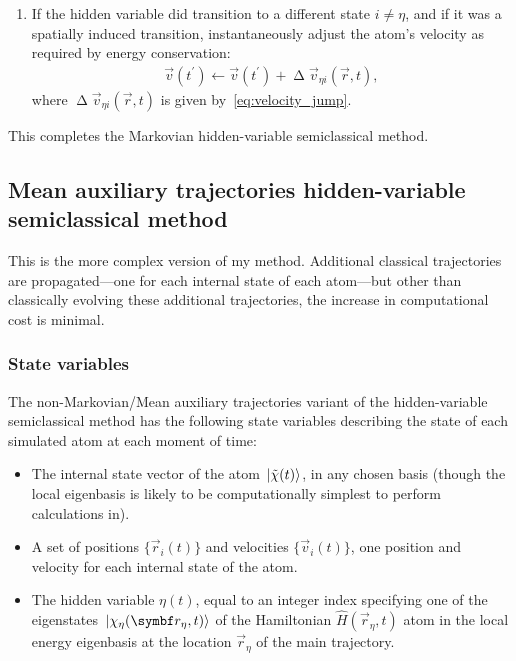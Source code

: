 \begin{enumerate}
    \item If the hidden variable did transition to a different state $i\neq\eta$, and if it was a spatially induced transition, instantaneously adjust the atom's velocity as required by energy conservation:
    \begin{align}
    \vec v(t^\prime) \leftarrow \vec v(t^\prime) + \upDelta \vec v_{\eta i}(\vec r, t),
    \end{align}
    where $\upDelta \vec v_{\eta i}(\vec r, t)$ is given by~\eqref{eq:velocity_jump}.
\end{enumerate}

This completes the Markovian hidden-variable semiclassical method.

\subsection{Mean auxiliary trajectories hidden-variable semiclassical method}\label{sec:algo_non_markovian}

This is the more complex version of my method. Additional classical trajectories are propagated---one for each internal state of each atom---but other than classically evolving these additional trajectories, the increase in computational cost is minimal.

\subsubsection{State variables}
The non-Markovian/Mean auxiliary trajectories variant of the hidden-variable semiclassical method has the following state variables describing the state of each simulated atom at each moment of time:
\begin{itemize}
    \item The internal state vector of the atom $\ket{\tilde\chi(t)}$, in any chosen basis (though the local eigenbasis is likely to be computationally simplest to perform calculations in).
    \item A set of positions $\{\vec r_i(t)\}$ and velocities $\{\vec v_i(t)\}$, one position and velocity for each internal state of the atom.
    \item The hidden variable $\eta(t)$, equal to an integer index specifying one of the eigenstates $\ket{\chi_\eta(\vec r_\eta, t)}$ of the Hamiltonian $\hat H(\vec r_\eta, t)$ atom in the local energy eigenbasis at the location $\vec r_\eta$ of the main trajectory.
\end{itemize}

